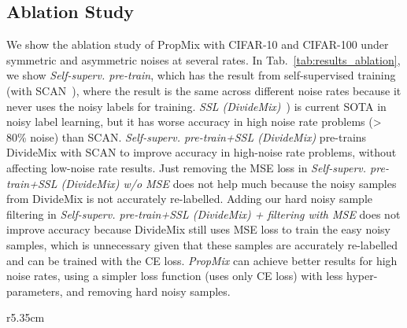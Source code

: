 \documentclass{bmvc2k}
\begin{document}
\subsection{Ablation Study}
\label{sec:ablation}

We show the ablation study of PropMix with CIFAR-10 and CIFAR-100 under symmetric and asymmetric noises at several rates. In Tab.~\ref{tab:results_ablation}, we show \emph{Self-superv. pre-train}, which has the result from self-supervised training (with SCAN~\citep{SCAN}), where the result is the same across different noise rates because it never uses the noisy labels for training. 
\emph{SSL (DivideMix)}~\citep{DivideMix}) is current SOTA in noisy label learning, but it has worse accuracy in high noise rate problems (> 80\% noise) than SCAN. \emph{Self-superv. pre-train+SSL (DivideMix)} pre-trains DivideMix with SCAN to improve accuracy in high-noise rate problems, without affecting low-noise rate results.
Just removing the MSE loss in \emph{Self-superv. pre-train+SSL (DivideMix) w/o MSE} does not help much because the noisy samples from DivideMix is not accurately re-labelled.
Adding our hard noisy sample filtering in \emph{Self-superv. pre-train+SSL (DivideMix) + filtering with MSE} does not improve accuracy because DivideMix still uses MSE loss to train the easy noisy samples, which is unnecessary given that these samples are  accurately re-labelled and can be trained with the CE loss.
\emph{PropMix} can achieve better results for high noise rates, using a simpler loss function (uses only CE loss) with less hyper-parameters, and removing hard noisy samples.

\begin{wraptable}{r}{5.35cm}
\centering
{}
\caption{Test accuracy (\%) for WebVision~\citep{webvision}  by methods trained with 100 epochs. Baselines come from~\cite{DivideMix}. Top methods within  in \textbf{bold}.}
\label{tab:res_WebVision}
\end{wraptable}
\end{document}
